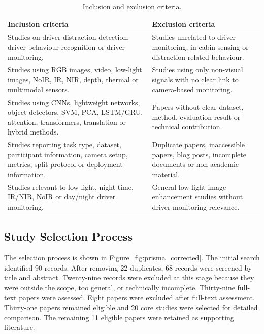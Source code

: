 \documentclass[11pt,a4paper]{article}
\let\oldsubsection\subsection
\renewcommand{\subsection}{\Needspace{6\baselineskip}\oldsubsection}
\begin{document}
\begin{table}[H]
\centering
\caption{Inclusion and exclusion criteria.}
\label{tab:criteria}
\small
\renewcommand{\arraystretch}{1.12}
\begin{tabularx}{\linewidth}{>{\RaggedRight\arraybackslash}X >{\RaggedRight\arraybackslash}X}
\toprule
\textbf{Inclusion criteria} & \textbf{Exclusion criteria} \\
\midrule
Studies on driver distraction detection, driver behaviour recognition or driver monitoring. & Studies unrelated to driver monitoring, in-cabin sensing or distraction-related behaviour. \\
Studies using RGB images, video, low-light images, NoIR, IR, NIR, depth, thermal or multimodal sensors. & Studies using only non-visual signals with no clear link to camera-based monitoring. \\
Studies using CNNs, lightweight networks, object detectors, SVM, PCA, LSTM/GRU, attention, transformers, translation or hybrid methods. & Papers without clear dataset, method, evaluation result or technical contribution. \\
Studies reporting task type, dataset, participant information, camera setup, metrics, split protocol or deployment information. & Duplicate papers, inaccessible papers, blog posts, incomplete documents or non-academic material. \\
Studies relevant to low-light, night-time, IR/NIR, NoIR or day/night driver monitoring. & General low-light image enhancement studies without driver monitoring relevance. \\
\bottomrule
\end{tabularx}
\normalsize
\end{table}

\subsection{Study Selection Process}

The selection process is shown in Figure~\ref{fig:prisma_corrected}. The initial search identified 90 records. After removing 22 duplicates, 68 records were screened by title and abstract. Twenty-nine records were excluded at this stage because they were outside the scope, too general, or technically incomplete. Thirty-nine full-text papers were assessed. Eight papers were excluded after full-text assessment. Thirty-one papers remained eligible and 20 core studies were selected for detailed comparison. The remaining 11 eligible papers were retained as supporting literature.
\end{document}
